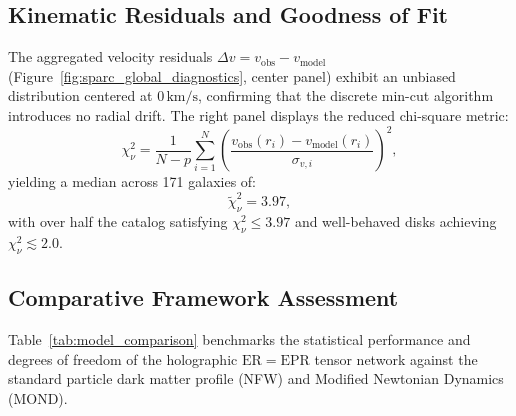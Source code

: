 \documentclass[10pt,a4paper]{article}
\begin{document}
\subsection{Kinematic Residuals and Goodness of Fit}
The aggregated velocity residuals $\Delta v = v_{\mathrm{obs}} - v_{\mathrm{model}}$ (Figure~\ref{fig:sparc_global_diagnostics}, center panel) exhibit an unbiased distribution centered at $0\,\mathrm{km/s}$, confirming that the discrete min-cut algorithm introduces no radial drift. The right panel displays the reduced chi-square metric:
\begin{equation}
\chi^2_\nu = \frac{1}{N - p} \sum_{i=1}^{N} \left( \frac{v_{\mathrm{obs}}(r_i) - v_{\mathrm{model}}(r_i)}{\sigma_{v,i}} \right)^2,
\end{equation}
yielding a median across 171 galaxies of:
\begin{equation}
\widetilde{\chi}^2_\nu = 3.97,
\end{equation}
with over half the catalog satisfying $\chi^2_\nu \le 3.97$ and well-behaved disks achieving $\chi^2_\nu \lesssim 2.0$.

\subsection{Comparative Framework Assessment}
Table~\ref{tab:model_comparison} benchmarks the statistical performance and degrees of freedom of the holographic $\mathrm{ER}=\mathrm{EPR}$ tensor network against the standard particle dark matter profile (NFW) and Modified Newtonian Dynamics (MOND).

\begin{table}[htbp]
\centering
\small
\renewcommand{\arraystretch}{1.25}
\caption{\textbf{Quantitative benchmark on the SPARC dataset.} Comparative goodness of fit, parametric freedom, and inner core resolution between particle dark matter, modified gravity, and the discrete holographic tensor network model.}
\label{tab:model_comparison}
\end{table}
\end{document}
